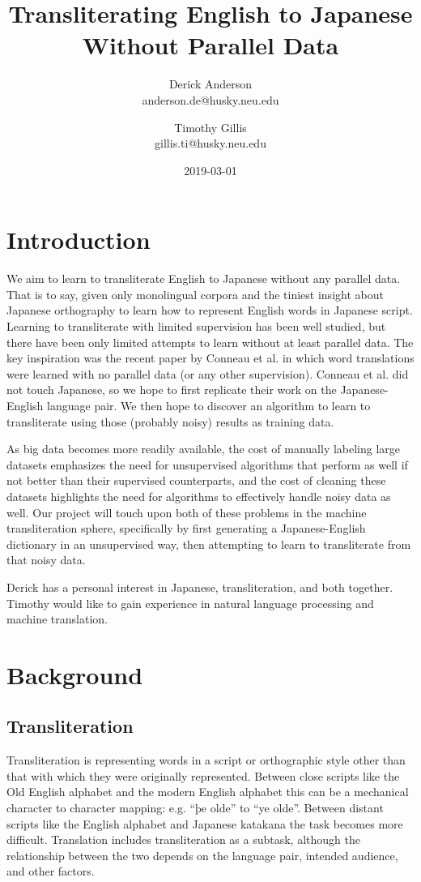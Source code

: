 \documentclass{article}
\title{Transliterating English to Japanese Without Parallel Data}
\date{2019-03-01}
\author{Derick Anderson \\ anderson.de@husky.neu.edu
  \and Timothy Gillis \\ gillis.ti@husky.neu.edu }
\begin{document}
\maketitle

\section*{Introduction}

We aim to learn to transliterate English to Japanese
without any parallel data.
That is to say,
given only monolingual corpora
and the tiniest insight about Japanese orthography
to learn how to represent English words in Japanese script.
Learning to transliterate with limited supervision has been well studied,
but there have been only limited attempts to learn without at least parallel data.
The key inspiration was the recent paper by
Conneau et al. \cite{Conneau2018WordTW}
in which word translations were learned with no parallel data
(or any other supervision).
Conneau et al. did not touch Japanese,
so we hope to first replicate their work on the Japanese-English language pair.
We then hope to discover an algorithm to learn to transliterate
using those (probably noisy) results as training data.

As big data becomes more readily available, the cost of manually labeling large
datasets emphasizes the need for unsupervised algorithms that perform as well if
not better than their supervised counterparts, and the cost of cleaning these
datasets highlights the need for algorithms to effectively handle noisy data as well.
Our project will touch upon both of these problems in the machine transliteration
sphere, specifically by first generating a Japanese-English dictionary in an
unsupervised way, then attempting to learn to transliterate from that noisy data.

Derick has a personal interest in Japanese, transliteration, and both together.
Timothy would like to gain experience in natural language processing and machine
translation.

\section*{Background}

\subsection*{Transliteration}

Transliteration is representing words
in a script or orthographic style
other than that with which they were originally represented.
Between close scripts like the Old English alphabet and the modern English alphabet
this can be a mechanical character to character mapping:
e.g. ``þe olde'' to ``ye olde''.
Between distant scripts
like the English alphabet and Japanese katakana
the task becomes more difficult.
Translation includes transliteration as a subtask,
although the relationship between the two
depends on the language pair, intended audience, and other factors.
\end{document}
